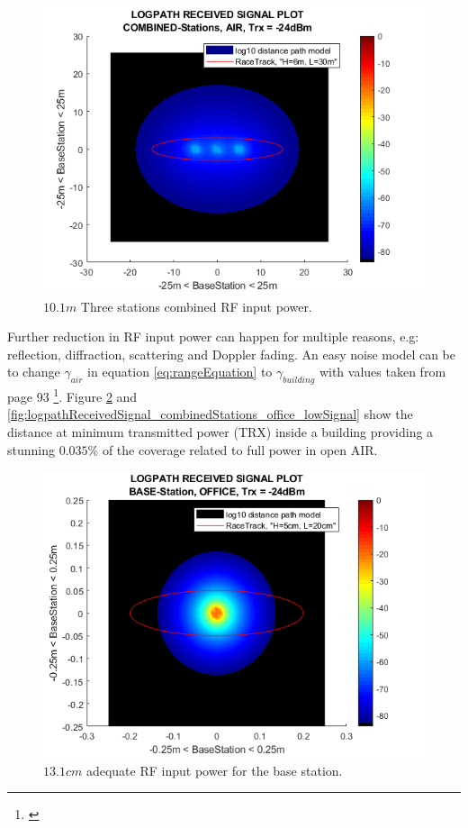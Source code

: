 \begin{figure}[h]
	\centering
	\includegraphics[width=1\linewidth]{theory/pathLoss/fig/logpathReceivedSignal_combinedStations_air_lowSignal.png}
	\caption{$10.1m$ Three stations combined RF input power.}
	\label{fig:logpathReceivedSignal_combinedStations_air_lowSignal}
\end{figure}

\noindent Further reduction in RF input power can happen for multiple reasons, e.g: reflection, diffraction, scattering and Doppler fading. An easy noise model can be to change $\gamma_{air}$ in equation \ref{eq:rangeEquation} to $\gamma_{building}$ with values taken from page 93 \footnote{\cite{Karl2006}}. Figure \ref{fig:logpathReceivedSignal_baseStation_office_lowSignal} and \ref{fig:logpathReceivedSignal_combinedStations_office_lowSignal} show the distance at minimum transmitted power (TRX) inside a building providing a stunning $0.035\%$ of the coverage related to full power in open AIR.

\begin{figure}[h]
	\centering
	\includegraphics[width=1\linewidth]{theory/pathLoss/fig/logpathReceivedSignal_baseStation_office_lowSignal.png}
	\caption{$13.1cm$ adequate RF input power for the base station.}
	\label{fig:logpathReceivedSignal_baseStation_office_lowSignal}
\end{figure}

